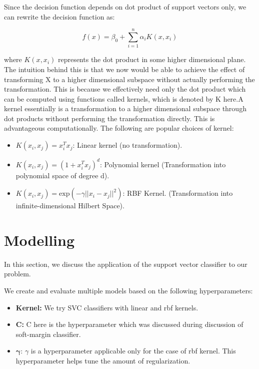 \documentclass[conference]{IEEEtran}
\begin{document}
Since the decision function depends on dot product of support vectors only, we can rewrite the decision function as:

$$ f(x) = \beta_0 + \sum_{i = 1}^n\alpha_i K(x, x_i) $$

where $K(x, x_i)$ represents the dot product in some higher dimensional plane. The intuition behind this is that we now would be able to achieve the effect of transforming X to a higher dimensional subspace without actually performing the transformation. This is because we effectively need only the dot product which can be computed using functions called kernels, which is denoted by K here.A kernel essentially is a transformation to a higher dimensional subspace through dot products without performing the transformation directly. This is advantageous computationally. The following are popular choices of kernel:

\begin{itemize}
    \item $K(x_i, x_j) = x_i^Tx_j$: Linear kernel (no transformation).
    \item $K(x_i, x_j) = (1+x_i^Tx_j)^d$: Polynomial kernel (Transformation into polynomial space of degree d).
    \item $K(x_i, x_j) = \textrm{exp}(-\gamma||x_i-x_j||^2)$: RBF Kernel. (Transformation into infinite-dimensional Hilbert Space).
\end{itemize}

\section{Modelling }

In this section, we discuss the application of the support vector classifier to our problem. 

We create and evaluate multiple models based on the following hyperparameters:

\begin{itemize}
    \item \textbf{Kernel:} We try SVC classifiers with linear and rbf kernels.
    \item \textbf{C:} C here is the hyperparameter which was discussed during discussion of soft-margin classifier.
    \item $\mathbf{\gamma}$: $\gamma$ is a hyperparameter applicable only for the case of rbf kernel. This hyperparameter helps tune the amount of regularization.
\end{itemize}
\end{document}

